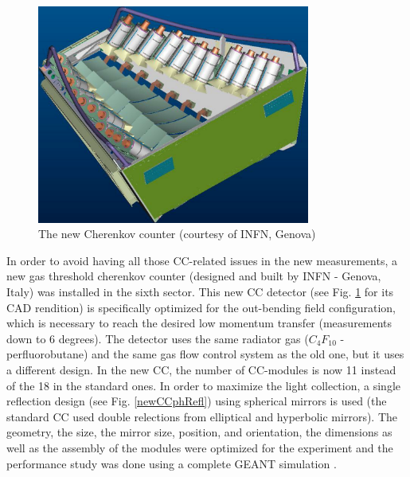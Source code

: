 \begin{figure}[h] %
\centering
\leavevmode \includegraphics[width=0.8\textwidth]{figuresEG4/FigExp/assieme_totaleCut.pdf}  %
\caption[New Cherenkov counter]{The new Cherenkov counter (courtesy of INFN, Genova)}
\label{nwCcCAD}
\end{figure}



In order to avoid having all those CC-related issues in the new measurements, a new gas threshold cherenkov counter (designed and built by INFN - Genova, Italy) was installed in the sixth sector. %
This new CC detector (see Fig. \ref{nwCcCAD} for its CAD rendition) is specifically optimized for the out-bending field configuration, which is necessary to reach the desired low momentum transfer (measurements down to 6 degrees). The detector uses the same radiator gas ($C_4 F_{10}$ - perfluorobutane) and the same gas flow control system as the old one, but it uses a %
different design. %
In the new CC, the number of CC-modules %
is now 11 instead of the 18 in the standard ones. In order to maximize the light collection, a single reflection design (see Fig. \ref{newCCphRefl}) using spherical mirrors is used (the standard CC used double relections from elliptical and hyperbolic mirrors). The geometry, the size, the mirror size, position, and orientation, the dimensions as well as the assembly of the modules were optimized for the experiment %
and the performance study was %
done using a complete GEANT simulation \cite{propE03_006}.


